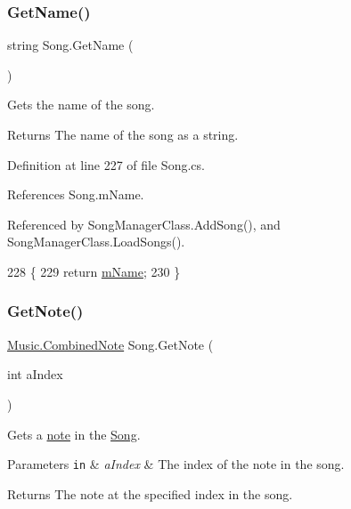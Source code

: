 \subsubsection{\texorpdfstring{Get\+Name()}{GetName()}}
{\footnotesize\ttfamily string Song.\+Get\+Name (\begin{DoxyParamCaption}{ }\end{DoxyParamCaption})}



Gets the name of the song. 

\begin{DoxyReturn}{Returns}
The name of the song as a string. 
\end{DoxyReturn}


Definition at line 227 of file Song.\+cs.



References Song.\+m\+Name.



Referenced by Song\+Manager\+Class.\+Add\+Song(), and Song\+Manager\+Class.\+Load\+Songs().


\begin{DoxyCode}
228     \{
229         \textcolor{keywordflow}{return} \hyperlink{group___song_priv_var_ga6a5e6c1e4aa92939e2b5c1e3d9908df8}{mName};
230     \}
\end{DoxyCode}
\mbox{\label{group___song_pub_func_ga485c83c9278103fed23c532bba1252f0}} 
\subsubsection{\texorpdfstring{Get\+Note()}{GetNote()}}
{\footnotesize\ttfamily \hyperlink{group___music_structs_struct_music_1_1_combined_note}{Music.\+Combined\+Note} Song.\+Get\+Note (\begin{DoxyParamCaption}\item[{int}]{a\+Index }\end{DoxyParamCaption})}



Gets a \hyperlink{group___music_structs_struct_music_1_1_combined_note}{note} in the \hyperlink{class_song}{Song}. 


\begin{DoxyParams}[1]{Parameters}
\mbox{\tt in}  & {\em a\+Index} & The index of the note in the song. \\
\hline
\end{DoxyParams}
\begin{DoxyReturn}{Returns}
The note at the specified index in the song. 
\end{DoxyReturn}


